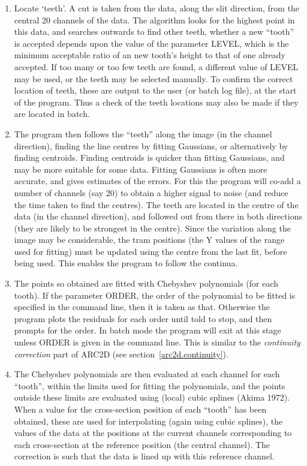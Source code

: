 \documentclass[11pt,twoside]{article}
\begin{document}
\begin{enumerate}

\item Locate `teeth'. A cut is taken from the data, along the slit
direction, from the central 20 channels of the data.  The algorithm
looks for the highest point in this data, and searches outwards to find
other teeth, whether a new ``tooth'' is accepted depends upon the value
of the parameter LEVEL, which is the minimum acceptable ratio of an new
tooth's height to that of one already accepted. If too many or too few
teeth are found, a different value of LEVEL may be used, or the teeth
may be selected manually. To confirm the correct location of teeth,
these are output to the user (or batch log file), at the start of the
program. Thus a check of the teeth locations may also be made if they
are located in batch.

\item The program then follows the ``teeth'' along the image (in the
channel direction), finding the line centres by fitting Gaussians, or
alternatively by finding centroids. Finding centroids is quicker than
fitting Gaussians, and may be more suitable for some data. Fitting
Gaussians is often more accurate, and gives estimates of the errors.
For this the program will co-add a number of channels (say 20) to
obtain a higher signal to noise (and reduce the time taken to find the
centres).  The teeth are located in the centre of the data (in the
channel direction), and followed out from there in both directions
(they are likely to be strongest in the centre).  Since the variation
along the image may be considerable, the tram positions (the Y values
of the range used for fitting) must be updated using the centre from
the last fit, before being used.  This enables the program to follow
the continua.

\item The points so obtained are fitted with Chebyshev polynomials (for
each tooth). If the parameter ORDER, the order of the polynomial to be
fitted is specified in the command line, then it is taken as that.
Otherwise the program plots the residuals for each order until told to
stop, and then prompts for the order.  In batch mode the program will
exit at this stage unless ORDER is given in the command line.  This is
similar to the {\em continuity correction} part of ARC2D (see
section~\ref{arc2d.continuity}).

\item The Chebyshev polynomials are then evaluated at each channel for
each ``tooth'', within the limits used for fitting the polynomials, and
the points outside these limits are evaluated using (local) cubic
splines (Akima 1972). When a value for the cross-section position of
each ``tooth'' has been obtained, these are used for interpolating
(again using cubic splines), the values of the data at the positions at
the current channels corresponding to each cross-section at the
reference position (the central channel). The correction is such that
the data is lined up with this reference channel.

\end{enumerate}
\end{document}
